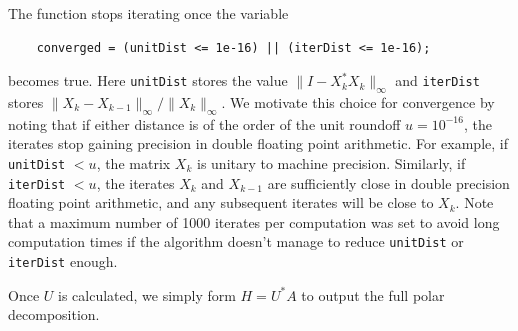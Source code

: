 \documentclass[10pt, A4paper]{article}
\begin{document}
The function stops iterating once the variable
\begin{verbatim}
	converged = (unitDist <= 1e-16) || (iterDist <= 1e-16);
\end{verbatim}
becomes true.
Here \texttt{unitDist} stores the value $\|I -X_k^*X_k\|_\infty$ and 
\texttt{iterDist} stores $\|X_k - X_{k-1} \|_\infty / \|X_k\|_\infty$.
We motivate this choice for convergence by noting that if either 
distance is of the order of the unit roundoff $u = 10^{-16}$, the 
iterates stop gaining precision in double floating point arithmetic.
For example, if \texttt{unitDist} $< u$, the matrix $X_k$ is unitary to 
machine precision. Similarly, if \texttt{iterDist} $< u$, the iterates 
$X_k$ and $X_{k-1}$ are sufficiently close in double precision floating 
point arithmetic, and any subsequent iterates will be close to $X_k$.
Note that a maximum number of 1000 iterates per computation was set to 
avoid long computation times if the algorithm doesn't manage to reduce 
\texttt{unitDist} or \texttt{iterDist} enough.

Once $U$ is calculated, we simply form $H = U^*A$ to output the full 
polar decomposition.
\end{document}
